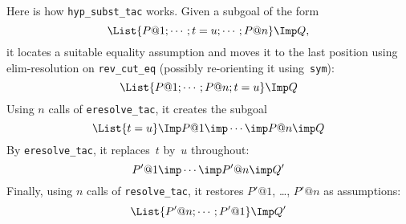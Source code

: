 Here is how {\tt hyp_subst_tac} works.  Given a subgoal of the form
\[ \List{P@1; \cdots ; t=u; \cdots ; P@n} \Imp Q, \] it locates a suitable
equality assumption and moves it to the last position using elim-resolution
on {\tt rev_cut_eq} (possibly re-orienting it using~{\tt sym}):
\[ \List{P@1; \cdots ; P@n; t=u} \Imp Q \]
Using $n$ calls of {\tt eresolve_tac\ts[rev_mp]}, it creates the subgoal
\[ \List{t=u} \Imp P@1\imp \cdots \imp P@n \imp Q \]
By {\tt eresolve_tac\ts[ssubst]}, it replaces~$t$ by~$u$ throughout:
\[ P'@1\imp \cdots \imp P'@n \imp Q' \]
Finally, using $n$ calls of \hbox{\tt resolve_tac}, it restores
$P'@1$, \ldots, $P'@n$ as assumptions:
\[ \List{P'@n; \cdots ; P'@1} \Imp Q' \]

